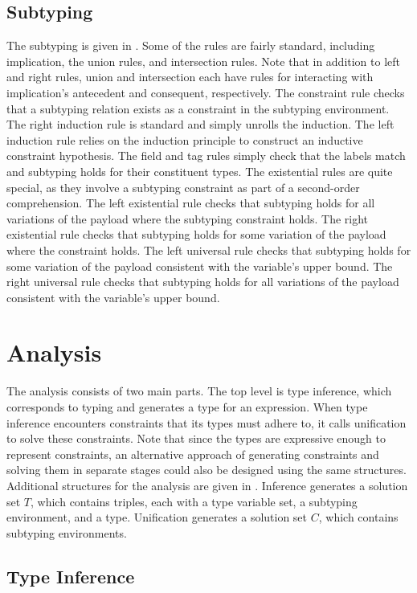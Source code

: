 \documentclass[sigplan,screen,review]{acmart}
\begin{document}
\subsection{Subtyping}
The subtyping is given in .
Some of the rules are fairly standard, including implication, the union rules, and intersection rules.
Note that in addition to left and right rules, union and intersection each have rules for 
interacting with implication's antecedent and consequent, respectively.
The constraint rule checks that a subtyping relation exists as a constraint in the subtyping environment.
The right induction rule is standard and simply unrolls the induction.
The left induction rule relies on the induction principle to construct an 
inductive constraint hypothesis.  
The field and tag rules simply check that the labels match and subtyping holds for their constituent types.
The existential rules are quite special, as they involve a subtyping constraint as part of 
a second-order comprehension. 
The left existential rule checks that subtyping holds for all variations of the payload 
where the subtyping constraint holds. 
The right existential rule checks that subtyping holds for some variation of the payload where the constraint holds.
The left universal rule checks that subtyping holds for some variation of the payload consistent with
the variable's upper bound. 
The right universal rule checks that subtyping holds for all variations of the payload consistent with
the variable's upper bound.


\section{Analysis}

The analysis consists of two main parts. The top level is type inference, which corresponds to typing
and generates a type for an expression. When type inference encounters constraints that its types must adhere to,
it calls unification to solve these constraints. Note that since the types are expressive enough to represent constraints,
an alternative approach of generating constraints and solving them in separate stages could also be designed 
using the same structures. Additional structures for the analysis are given in . 
Inference generates a solution set $T$, which contains triples, each with a type variable set, a subtyping environment, and a type.  
Unification generates a solution set $C$, which contains subtyping environments. 


\subsection{Type Inference}
\end{document}
